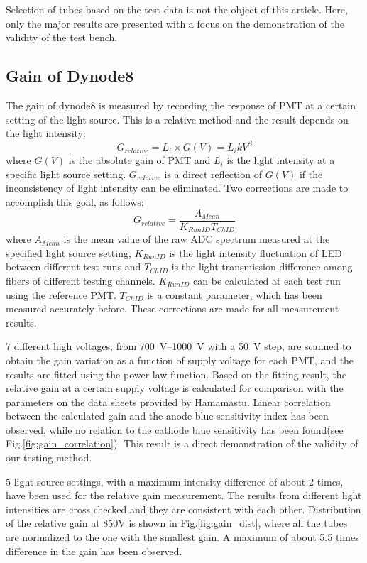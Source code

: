 \documentclass[review, times]{elsarticle}
\begin{document}
Selection of tubes based on the test data is not the object of this article.
Here, only the major results are presented with a focus on the demonstration of the validity of the test bench. 

\subsection{Gain of Dynode8}
\label{sec:psd_gain}

The gain of dynode8 is measured by recording the response of PMT at a certain setting of the light source. 
This is a relative method and the result depends on the light intensity:
\begin{equation}
 G_{relative} = L_i \times G(V) = L_i k V^\beta
\end{equation}
where $G(V)$ is the absolute gain of PMT and $L_i$ is the light intensity at a specific light source setting.
$G_{relative}$ is a direct reflection of $G(V)$ if the inconsistency of light intensity can be eliminated.
Two corrections are made to accomplish this goal, as follows: 
\begin{equation}
 G_{relative} = \frac{A_{Mean}}{K_{RunID} T_{ChID}}
\end{equation} 
where $A_{Mean}$ is the mean value of the raw ADC spectrum measured at the specified light source setting,
$K_{RunID}$ is the light intensity fluctuation of LED between different test runs and $T_{ChID}$ is the light transmission difference among fibers of different testing channels.
$K_{RunID}$ can be calculated at each test run using the reference PMT.
$T_{ChID}$ is a constant parameter, which has been measured accurately before.
These corrections are made for all measurement results.

7 different high voltages, from \SIrange{700}{1000}{\volt} with a \SI{50}{\volt} step, are scanned to obtain the gain variation as a function of supply voltage for each PMT, and the results are fitted using the power law function.
Based on the fitting result, the relative gain at a certain supply voltage is calculated for comparison with the parameters on the data sheets provided by Hamamastu.
Linear correlation between the calculated gain and the anode blue sensitivity index has been observed, while no relation to the cathode blue sensitivity has been found(see Fig.\ref{fig:gain_correlation}).
This result is a direct demonstration of the validity of our testing method.

5 light source settings, with a maximum intensity difference of about 2 times, have been used for the relative gain measurement.
The results from different light intensities are cross checked and they are consistent with each other.
Distribution of the relative gain at 850V is shown in Fig.\ref{fig:gain_dist}, where all the tubes are normalized to the one with the smallest gain. 
A maximum of about 5.5 times difference in the gain has been observed.
\end{document}
